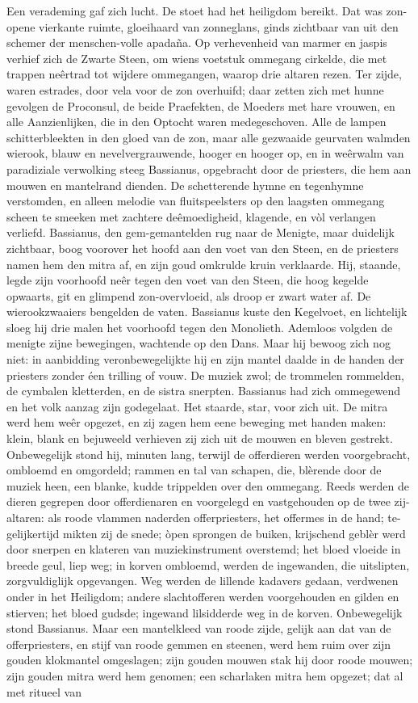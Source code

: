 \documentclass[a4paper, 12pt, oneside, dutch]{article}
\begin{document}
Een verademing gaf zich lucht. De stoet had het heiligdom bereikt. Dat was zon-opene vierkante ruimte, gloeihaard van zonneglans, ginds zichtbaar van uit den schemer der menschen-volle apadaña. Op verhevenheid van marmer en jaspis verhief zich de Zwarte Steen, om wiens voetstuk ommegang cirkelde, die met trappen neêrtrad tot wijdere ommegangen, waarop drie altaren rezen. Ter zijde, waren estrades, door vela voor de zon overhuifd; daar zetten zich met hunne gevolgen de Proconsul, de beide Praefekten, de Moeders met hare vrouwen, en alle Aanzienlijken, die in den Optocht waren medegeschoven. Alle de lampen schitterbleekten in den gloed van de zon, maar alle gezwaaide geurvaten walmden wierook, blauw en nevelvergrauwende, hooger en hooger op, en in weêrwalm van paradiziale verwolking steeg Bassianus, opgebracht door de priesters, die hem aan mouwen en mantelrand dienden. De schetterende hymne en tegenhymne verstomden, en alleen melodie van fluitspeelsters op den laagsten ommegang scheen te smeeken met zachtere deêmoedigheid, klagende, en vòl verlangen verliefd. Bassianus, den gem-gemantelden rug naar de Menigte, maar duidelijk zichtbaar, boog voorover het hoofd aan den voet van den Steen, en de priesters namen hem den mitra af, en zijn goud omkrulde kruin verklaarde. Hij, staande, legde zijn voorhoofd neêr tegen den voet van den Steen, die hoog kegelde opwaarts, git en glimpend zon-overvloeid, als droop er zwart water af. De wierookzwaaiers bengelden de vaten. Bassianus kuste den Kegelvoet, en lichtelijk sloeg hij drie malen het voorhoofd tegen den Monolieth. Ademloos volgden de menigte zijne bewegingen, wachtende op den Dans. Maar hij bewoog zich nog niet: in aanbidding veronbewegelijkte hij en zijn mantel daalde in de handen der priesters zonder éen trilling of vouw. De muziek zwol; de trommelen rommelden, de cymbalen kletterden, en de sistra snerpten. Bassianus had zich ommegewend en het volk aanzag zijn godegelaat. Het staarde, star, voor zich uit. De mitra werd hem weêr opgezet, en zij zagen hem eene beweging met handen maken: klein, blank en bejuweeld verhieven zij zich uit de mouwen en bleven gestrekt. Onbewegelijk stond hij, minuten lang, terwijl de offerdieren werden voorgebracht, ombloemd en omgordeld; rammen en tal van schapen, die, blèrende door de muziek heen, een blanke, kudde trippelden over den ommegang. Reeds werden de dieren gegrepen door offerdienaren en voorgelegd en vastgehouden op de twee zij-altaren: als roode vlammen naderden offerpriesters, het offermes in de hand; te-gelijkertijd mikten zij de snede; òpen sprongen de buiken, krijschend geblèr werd door snerpen en klateren van muziekinstrument overstemd; het bloed vloeide in breede geul, liep weg; in korven ombloemd, werden de ingewanden, die uitslipten, zorgvuldiglijk opgevangen. Weg werden de lillende kadavers gedaan, verdwenen onder in het Heiligdom; andere slachtofferen werden voorgehouden en gilden en stierven; het bloed gudsde; ingewand lilsidderde weg in de korven. Onbewegelijk stond Bassianus. Maar een mantelkleed van roode zijde, gelijk aan dat van de offerpriesters, en stijf van roode gemmen en steenen, werd hem ruim over zijn gouden klokmantel omgeslagen; zijn gouden mouwen stak hij door roode mouwen; zijn gouden mitra werd hem genomen; een scharlaken mitra hem opgezet; dat al met ritueel van 
\end{document}
